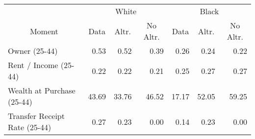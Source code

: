 \begin{tabular}{l rrr rrr}
\toprule & \multicolumn{3}{c}{White} & \multicolumn{3}{c}{Black} \\ \cmidrule(lr){2-4}\cmidrule(lr){5-7}
\multicolumn{1}{c}{Moment} & \multicolumn{1}{c}{Data} & \multicolumn{1}{c}{Altr.} & \multicolumn{1}{c}{No Altr.} & \multicolumn{1}{c}{Data} & \multicolumn{1}{c}{Altr.} & \multicolumn{1}{c}{No Altr.}\\
\midrule
\;Owner (25-44) & 0.53 & 0.52 & 0.39 & 0.26 & 0.24 & 0.22\\
\;Rent / Income (25-44) & 0.22 & 0.22 & 0.21 & 0.25 & 0.27 & 0.27\\
\;Wealth at Purchase (25-44) & 43.69 & 33.76 & 46.52 & 17.17 & 52.05 & 59.25\\
\;Transfer Receipt Rate (25-44) & 0.27 & 0.23 & 0.00 & 0.14 & 0.23 & 0.00\\
\bottomrule
\end{tabular}
